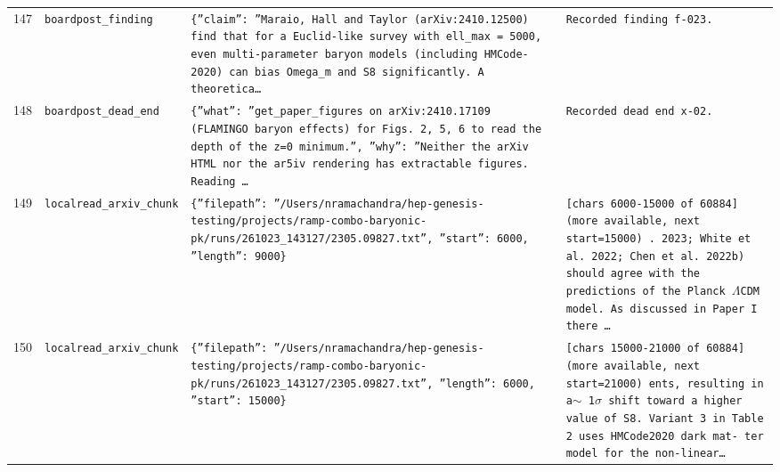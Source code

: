 \documentclass[11pt,a4paper]{article}
\begin{document}
\begin{longtable}{@{}p{}p{}p{}p{}@{}}
147 & \texttt{board}\newline\texttt{post\_\allowbreak{}finding} & \texttt{\{''claim'':\allowbreak{} ''Maraio,\allowbreak{} Hall and Taylor (arXiv:\allowbreak{}2410.12500)\allowbreak{} find that for a Euclid-like survey with ell\_\allowbreak{}max =\allowbreak{} 5000,\allowbreak{} even multi-parameter baryon models (including HMCode-2020)\allowbreak{} can bias Omega\_\allowbreak{}m and S8 significantly. A theoretica\ldots{}\allowbreak{}} & \texttt{Recorded finding f-023.} \\
148 & \texttt{board}\newline\texttt{post\_\allowbreak{}dead\_\allowbreak{}end} & \texttt{\{''what'':\allowbreak{} ''get\_\allowbreak{}paper\_\allowbreak{}figures on arXiv:\allowbreak{}2410.17109 (FLAMINGO baryon effects)\allowbreak{} for Figs. 2,\allowbreak{} 5,\allowbreak{} 6 to read the depth of the z=\allowbreak{}0 minimum.'',\allowbreak{} ''why'':\allowbreak{} ''Neither the arXiv HTML nor the ar5iv rendering has extractable figures. Reading \ldots{}\allowbreak{}} & \texttt{Recorded dead end x-02.} \\
149 & \texttt{local}\newline\texttt{read\_\allowbreak{}arxiv\_\allowbreak{}chunk} & \texttt{\{''filepath'':\allowbreak{} ''/\allowbreak{}Users/\allowbreak{}nramachandra/\allowbreak{}hep-genesis-testing/\allowbreak{}projects/\allowbreak{}ramp-combo-baryonic-pk/\allowbreak{}runs/\allowbreak{}261023\_\allowbreak{}143127/\allowbreak{}2305.09827.txt'',\allowbreak{} ''start'':\allowbreak{} 6000,\allowbreak{} ''length'':\allowbreak{} 9000\}\allowbreak{}} & \texttt{[chars 6000-15000 of 60884]\allowbreak{} (more available,\allowbreak{} next start=\allowbreak{}15000)\allowbreak{}  . 2023;\allowbreak{} White et al. 2022;\allowbreak{} Chen et al. 2022b)\allowbreak{} should agree with the predictions of the Planck $\Lambda$CDM model. As discussed in Paper I there \ldots{}\allowbreak{}} \\
150 & \texttt{local}\newline\texttt{read\_\allowbreak{}arxiv\_\allowbreak{}chunk} & \texttt{\{''filepath'':\allowbreak{} ''/\allowbreak{}Users/\allowbreak{}nramachandra/\allowbreak{}hep-genesis-testing/\allowbreak{}projects/\allowbreak{}ramp-combo-baryonic-pk/\allowbreak{}runs/\allowbreak{}261023\_\allowbreak{}143127/\allowbreak{}2305.09827.txt'',\allowbreak{} ''length'':\allowbreak{} 6000,\allowbreak{} ''start'':\allowbreak{} 15000\}\allowbreak{}} & \texttt{[chars 15000-21000 of 60884]\allowbreak{} (more available,\allowbreak{} next start=\allowbreak{}21000)\allowbreak{}  ents,\allowbreak{} resulting in a$\sim$ 1$\sigma$ shift toward a higher value of S8. Variant 3 in Table 2 uses HMCode2020 dark mat- ter model for the non-linear\ldots{}\allowbreak{}} \\

\end{longtable}
\end{document}
